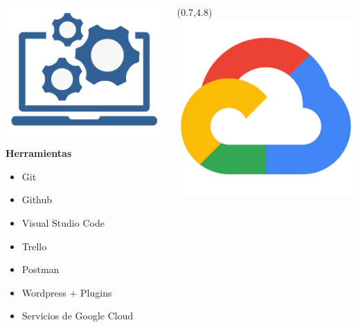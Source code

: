 \documentclass[10pt]{beamer}
\begin{document}
\begin{frame}
\begin{columns}[T]
\begin{column}{0.33\textwidth}
\begin{textblock}{2}
		\includegraphics[width =1\textwidth]{Figuras/tools.png}
	\end{textblock}
     \textbf{\textcolor{burgundy}{Herramientas}}
    \begin{itemize}
   		\item Git
   		\item Github
   		\item Visual Studio Code
   		\item Trello
   		\item Postman
   		\item Wordpress + Plugins
   		\item Servicios de Google Cloud
   \end{itemize} \pause
\end{column}
\begin{column}{0.33\textwidth}
	\begin{textblock}{1.75}(0.7,4.8)
		\includegraphics[width =1\textwidth]{Figuras/cloudicon.png}

\end{textblock}
\end{column}
\end{columns}
\end{frame}
\end{document}
